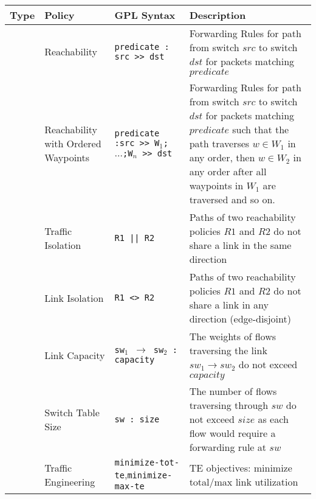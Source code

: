 \begin{table*}[thb]
\begin{small}
	\begin{center}
		\begin{tabular}{m{5em} | m{6em} | m{11em} | m{34em} } 
			Type & Policy &  GPL Syntax & Description \\ 
			\hline
			& Reachability & 	\texttt{predicate : src >> dst} & Forwarding Rules for path from switch $src$ to switch $dst$ for packets matching $predicate$ \\
			\hhline{~---}
			\multirow{3}{*}{Tenant} & Reachability with Ordered Waypoints & \texttt{predicate :\newline src >> W$_1$; $\ldots$;W$_n$ >> dst} & Forwarding Rules for path from switch $src$ to switch $dst$ for packets matching $predicate$ such that the path traverses $w \in W_1$ in any order, then $w \in W_2$ in any order after all waypoints in $W_1$ are traversed and so on.\\  
			\hhline{~---}
			& Traffic \newline Isolation & \texttt{R1 || R2} & Paths of two reachability policies $R1$ and $R2$ do not share a link in the same direction \\
			\hhline{~---}
			& Link \newline Isolation & \texttt{R1 <> R2} & Paths of two reachability policies $R1$ and $R2$ do not share a link in any direction (edge-disjoint) \\
			\hhline{----}
			& Link \newline Capacity & \texttt{sw$_1$ $\rightarrow$ sw$_2$ : capacity}  & The weights of flows traversing the link $sw_1 \rightarrow sw_2$ do not exceed $capacity$\\
			\hhline{~---}
			\multirow{2}{*}{Operator} & Switch \newline Table Size & \texttt{sw : size} & The number of flows traversing through $sw$ do not exceed $size$ as each flow would require a forwarding rule at $sw$ \\
			\hhline{~---}
			& Traffic \newline Engineering & \texttt{minimize-tot-te},\newline \texttt{minimize-max-te} & TE objectives: minimize total/max link utilization \\
		\end{tabular}
	\end{center}
	 \label{tab:policysupport} 
\end{small}
\end{table*}


